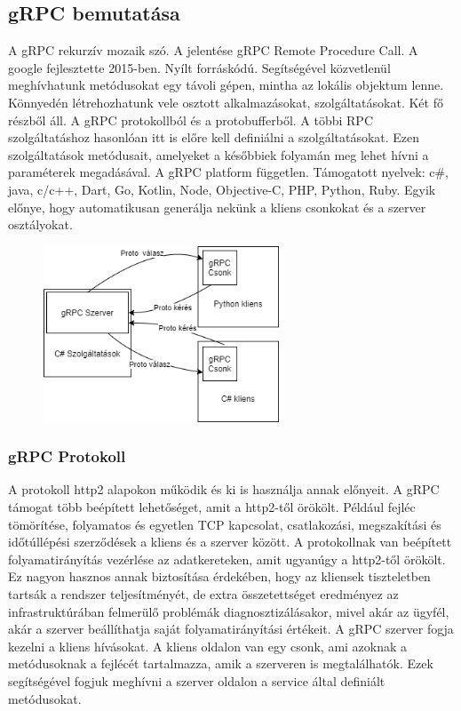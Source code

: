 \documentclass[
]{thesis-ekf}
\theoremstyle{definition}
\theoremstyle{remark}
\begin{document}
\subsection{gRPC bemutatása}
A gRPC rekurzív mozaik szó. A jelentése gRPC Remote Procedure Call. A google fejlesztette 2015-ben. Nyílt forráskódú. Segítségével közvetlenül meghívhatunk metódusokat egy távoli gépen, mintha az lokális objektum lenne. Könnyedén létrehozhatunk vele osztott alkalmazásokat, szolgáltatásokat. Két fő részből áll. A gRPC protokollból és a protobufferből. A többi RPC szolgáltatáshoz hasonlóan itt is előre kell definiálni a szolgáltatásokat. Ezen szolgáltatások metódusait, amelyeket a későbbiek folyamán meg lehet hívni a paraméterek megadásával. A gRPC platform független. Támogatott nyelvek: c\#, java, c/c++, Dart, Go, Kotlin, Node, Objective-C, PHP, Python, Ruby. Egyik előnye, hogy automatikusan generálja nekünk a kliens csonkokat és a szerver osztályokat.
\begin{figure}
	\centering
	\includegraphics[width=7cm]{proto}
	\caption{}
	\label{fig:proto}
\end{figure}

\subsubsection {gRPC Protokoll}
A protokoll http2 alapokon működik és ki is használja annak előnyeit. A gRPC támogat több beépített lehetőséget, amit a http2-től örökölt. Például fejléc tömörítése, folyamatos és egyetlen TCP kapcsolat, csatlakozási, megszakítási és időtúllépési szerződések a kliens és a szerver között. A protokollnak van beépített folyamatirányítás vezérlése az adatkereteken, amit ugyanúgy a http2-től örökölt. Ez nagyon hasznos annak biztosítása érdekében, hogy az kliensek tiszteletben tartsák a rendszer teljesítményét, de extra összetettséget eredményez az infrastruktúrában felmerülő problémák diagnosztizálásakor, mivel akár az ügyfél, akár a szerver beállíthatja saját folyamatirányítási értékeit. A gRPC szerver fogja kezelni a kliens hívásokat. A kliens oldalon van egy csonk, ami azoknak a metódusoknak a fejlécét tartalmazza, amik a szerveren is megtalálhatók. Ezek segítségével fogjuk meghívni a szerver oldalon a service által definiált metódusokat. 
\end{document}
